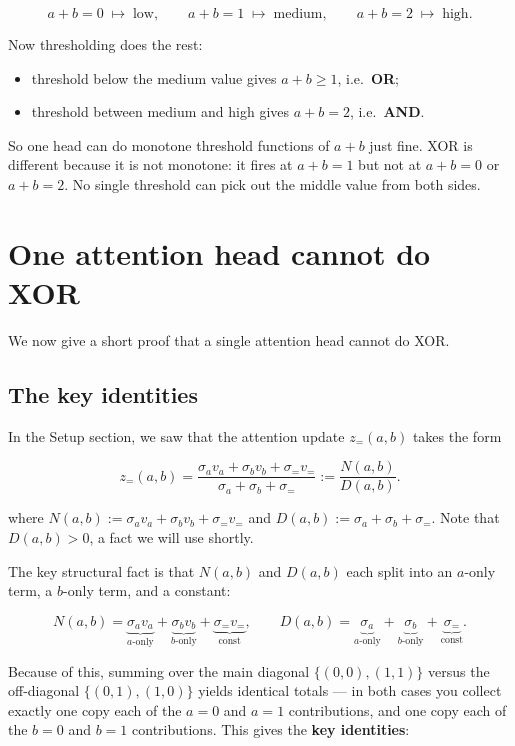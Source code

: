 \documentclass[
  11pt,
]{article}
\providecommand{\tightlist}{%
  \setlength{\itemsep}{0pt}\setlength{\parskip}{0pt}}
\begin{document}
\[
a+b=0 \;\mapsto\; \text{low},\qquad a+b=1 \;\mapsto\;\text{medium},\qquad a+b=2 \;\mapsto\; \text{high}.
\]

Now thresholding does the rest:

\begin{itemize}
\tightlist
\item
  threshold below the medium value gives \(a+b \ge 1\),
  i.e.~\textbf{OR};
\item
  threshold between medium and high gives \(a+b = 2\),
  i.e.~\textbf{AND}.
\end{itemize}

So one head can do monotone threshold functions of \(a+b\) just fine.
XOR is different because it is not monotone: it fires at \(a+b=1\) but
not at \(a+b=0\) or \(a+b=2\). No single threshold can pick out the
middle value from both sides.

\section{One attention head cannot do
XOR}\label{one-attention-head-cannot-do-xor}

We now give a short proof that a single attention head cannot do XOR.

\subsection{The key identities}\label{the-key-identities}

In the Setup section, we saw that the attention update \(z_=(a, b)\)
takes the form

\[
z_=(a,b)=\dfrac{\sigma_a v_a+\sigma_b v_b+\sigma_= v_=}{\sigma_a+\sigma_b+\sigma_=}:= \dfrac{N(a,b)}{D(a,b)}.
\]

where \(N(a,b):=\sigma_a v_a+\sigma_b v_b+\sigma_= v_=\) and
\(D(a, b):=\sigma_a+\sigma_b+\sigma_=\). Note that \(D(a,b) > 0\), a
fact we will use shortly.

The key structural fact is that \(N(a,b)\) and \(D(a,b)\) each split
into an \(a\)-only term, a \(b\)-only term, and a constant:

\[
N(a,b) = \underbrace{\sigma_a v_a}_{a\text{-only}}+\underbrace{\sigma_b v_b}_{b\text{-only}}+\underbrace{\sigma_= v_=}_{\text{const}}, \qquad D(a,b)=\underbrace{\sigma_a}_{a\text{-only}}+\underbrace{\sigma_b}_{b\text{-only}}+\underbrace{\sigma_=}_{\text{const}}.
\]

Because of this, summing over the main diagonal \(\{(0,0),(1,1)\}\)
versus the off-diagonal \(\{(0,1),(1,0)\}\) yields identical totals ---
in both cases you collect exactly one copy each of the \(a{=}0\) and
\(a{=}1\) contributions, and one copy each of the \(b{=}0\) and
\(b{=}1\) contributions. This gives the \textbf{key identities}:
\end{document}
